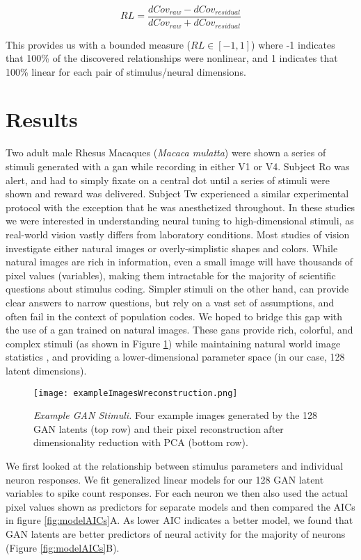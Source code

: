 \begin{equation}
	RL = \frac{dCov_{raw} - dCov_{residual}}{dCov_{raw} + dCov_{residual}}
\end{equation}

This provides us with a bounded measure ($RL \in [-1, 1]$) where -1 indicates that 100\% of the discovered relationships were nonlinear, and 1 indicates that 100\% linear for each pair of stimulus/neural dimensions.

\section{Results}
\glsresetall
Two adult male Rhesus Macaques (\textit{Macaca mulatta}) were shown a series of stimuli generated with a \gls{gan} while recording in either V1 or V4. Subject Ro was alert, and had to simply fixate on a central dot until a series of stimuli were shown and reward was delivered. Subject Tw experienced a similar experimental protocol with the exception that he was anesthetized throughout. In these studies we were interested in understanding neural tuning to high-dimensional stimuli, as real-world vision vastly differs from laboratory conditions. Most studies of vision investigate either natural images or overly-simplistic shapes and colors. While natural images are rich in information, even a small image will have thousands of pixel values (variables), making them intractable for the majority of scientific questions about stimulus coding. Simpler stimuli on the other hand, can provide clear answers to narrow questions, but rely on a vast set of assumptions, and often fail in the context of population codes. We hoped to bridge this gap with the use of a \gls{gan} trained on natural images. These \gls{gan}s provide rich, colorful, and complex stimuli (as shown in Figure \ref{fig:exampleReconstructions}) while maintaining natural world image statistics \parencite{Fruend2018}, and providing a lower-dimensional parameter space (in our case, 128 latent dimensions).


\begin{figure}
	\centering
	\texttt{[image: exampleImagesWreconstruction.png]}
	{\caption{{\it Example GAN Stimuli.} Four example images generated by the 128 GAN latents (top row) and their pixel reconstruction after dimensionality reduction with PCA (bottom row).}
	\label{fig:exampleReconstructions}}
\end{figure}

We first looked at the relationship between stimulus parameters and individual neuron responses. We fit generalized linear models for our 128 GAN latent variables to spike count responses. For each neuron we then also used the actual pixel values shown as predictors for separate models and then compared the AICs in figure \ref{fig:modelAICs}A. As lower AIC indicates a better model, we found that GAN latents are better predictors of neural activity for the majority of neurons (Figure \ref{fig:modelAICs}B).

